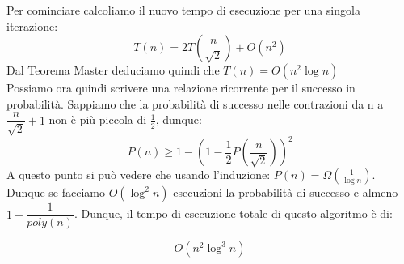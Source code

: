Per cominciare calcoliamo il nuovo tempo di esecuzione per una singola iterazione:
$$T(n) = 2T(\dfrac{n}{\sqrt{2}}) + O(n^2) $$
Dal Teorema Master deduciamo quindi che $T(n) = O(n^2 \log{n})$\\

\noindent Possiamo ora quindi scrivere una relazione ricorrente per il successo in probabilità. Sappiamo che la probabilità di successo nelle contrazioni da n a $\dfrac{n}{\sqrt{2}} + 1$ non è più piccola di $\frac{1}{2}$, dunque:
$$P(n) \geq 1-(1- \frac{1}{2}P(\dfrac{n}{\sqrt{2}}))^2$$
A questo punto si può vedere che usando l'induzione: $P(n)= \Omega(\frac{1}{\log{n}}) $. Dunque se facciamo $O(\log^2{n})$ esecuzioni la probabilità di successo e almeno $1-\dfrac{1}{poly(n)}$. Dunque, il tempo di esecuzione totale di questo algoritmo è di:

$$O(n^2 \log^3{n})$$
